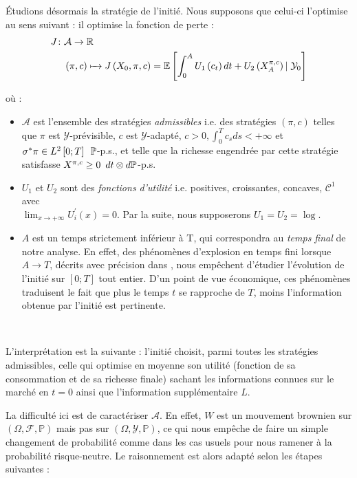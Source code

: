 \documentclass[../finalreport.tex]{subfiles}
\begin{document}
\par Étudions désormais la stratégie de l'initié. Nous supposons que celui-ci l'optimise au sens suivant : il optimise la fonction de perte :
\begin{align*}
      J \colon &\mathcal{A} \to \mathbb{R} \\
       &\left( \pi, c \right) \xmapsto{\phantom{\mathcal{A}}} J \left( X_0, \pi, c \right) = \mathbb{E} \left[ \int_0^A U_1 \left( c_t \right) dt + U_2 \left( X_A^{\pi, c} \right) \left\vert\right. \mathcal{Y}_0 \right]
\end{align*}

où : 
\begin{itemize}
\item $\mathcal{A}$ est l'ensemble des stratégies \emph{admissibles} i.e. des stratégies $\left( \pi, c \right)$ telles que $\pi$ est $\mathcal{Y}$-prévisible, $c$ est $\mathcal{Y}$-adapté, $c >0, \int_0^T c_s ds < + \infty$ et $\sigma^* \pi \in L^2 \left[ 0; T \right] \enskip \mathbb{P}$-p.s., et telle que la richesse engendrée par cette stratégie satisfasse $X^{\pi, c} \geq 0 \enskip dt \otimes d \mathbb{P}$-p.s.
\item $U_1$ et $U_2$ sont des \emph{fonctions d'utilité} i.e. positives, croissantes, concaves, $\mathcal{C}^1$ avec \\ $\lim_{x \to +\infty} U_i^{'} \left( x \right) = 0$. Par la suite, nous supposerons $U_1 = U_2 = \log$.
\item $A$ est un temps strictement inférieur à T, qui correspondra au \emph{temps final} de notre analyse. En effet, des phénomènes d'explosion en temps fini lorsque $A \to T$, décrits avec précision dans \cite{art3}, nous empêchent d'étudier l'évolution de l'initié sur $\left[ 0; T \right]$ tout entier. D'un point de vue économique, ces phénomènes traduisent le fait que plus le temps $t$ se rapproche de $T$, moins l'information obtenue par l'initié est pertinente.
\end{itemize}
\

\par L'interprétation est la suivante : l'initié choisit, parmi toutes les stratégies admissibles, celle qui optimise en moyenne son utilité (fonction de sa consommation et de sa richesse finale) sachant les informations connues sur le marché en $t = 0$ ainsi que l'information supplémentaire $L$.\\

\par La difficulté ici est de caractériser $\mathcal{A}$. En effet, $W$ est un mouvement brownien sur $\left(\Omega, \mathcal{F}, \mathbb{P} \right) $ mais pas sur $\left(\Omega, \mathcal{Y}, \mathbb{P} \right)$, ce qui nous empêche de faire un simple changement de probabilité comme dans les cas usuels pour nous ramener à la probabilité risque-neutre. Le raisonnement est alors adapté selon les étapes suivantes :
\end{document}
